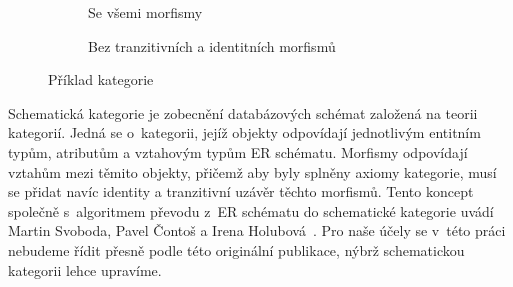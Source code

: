 \begin{figure}[!htb]
  \centering
  \begin{subfigure}{.45\textwidth}
    \centering
    \caption{Se všemi morfismy}%
    \label{fig:category-example-all}
  \end{subfigure}
  \begin{subfigure}{.45\textwidth}
    \centering
    \caption{Bez tranzitivních a identitních morfismů}%
    \label{fig:category-example-no-deduced}
  \end{subfigure}%
  \caption{Příklad kategorie}%
  \label{fig:category-example}%
\end{figure}

Schematická kategorie je zobecnění databázových schémat založená na teorii kategorií.
Jedná se o~kategorii, jejíž objekty odpovídají jednotlivým entitním typům, atributům a vztahovým typům ER schématu.
Morfismy odpovídají vztahům mezi těmito objekty, přičemž aby byly splněny axiomy kategorie, musí se přidat navíc identity a tranzitivní uzávěr těchto morfismů.
Tento koncept společně s~algoritmem převodu z~ER schématu do schematické kategorie uvádí Martin Svoboda, Pavel Čontoš a Irena Holubová~\cite{svoboda_categorical_2021}.
Pro naše účely se v~této práci nebudeme řídit přesně podle této originální publikace, nýbrž schematickou kategorii lehce upravíme.

